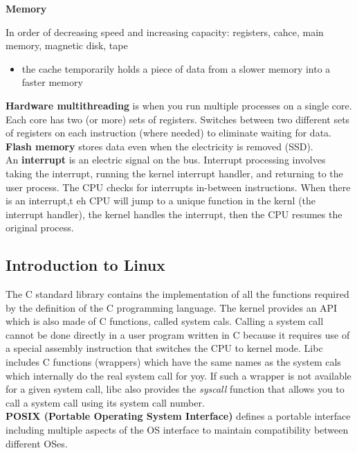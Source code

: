 \documentclass{article}
\begin{document}
    \noindent \textbf{Memory}

    \noindent In order of decreasing speed and increasing capacity: registers, cahce, main memory, magnetic disk, tape

    \begin{itemize}
    \item the cache temporarily holds a piece of data from a slower memory into a faster memory
    \end{itemize}

    \noindent \textbf{Hardware multithreading} is when you run multiple processes on a single core. Each core has two (or more) sets of registers. Switches between two different sets of registers on each instruction (where needed) to eliminate waiting for data. \\

    \noindent \textbf{Flash memory} stores data even when the electricity is removed (SSD). \\

    \noindent An \textbf{interrupt} is an electric signal on the bus. Interrupt processing involves taking the interrupt, running the kernel interrupt handler, and returning to the user process. The CPU checks for interrupts in-between instructions. When there is an interrupt,t eh CPU will jump to a unique function in the kernl (the interrupt handler), the kernel handles the interrupt, then the CPU resumes the original process. 

\subsection{Introduction to Linux}

    The C standard library contains the implementation of all the functions required by the definition of the C programming language. The kernel provides an API which is also made of C functions, called system cals. Calling a system call cannot be done directly in a user program written in C because it requires use of a special assembly instruction that switches the CPU to kernel mode. Libc includes C functions (wrappers) which have the same names as the system cals which internally do the real system call for yoy. If such a wrapper is not available for a given system call, libc also provides the \emph{syscall} function that allows you to call a system call using its system call number. \\

    \textbf{POSIX (Portable Operating System Interface)} defines a portable interface including multiple aspects of the OS interface to maintain compatibility between different OSes. \\
\end{document}
